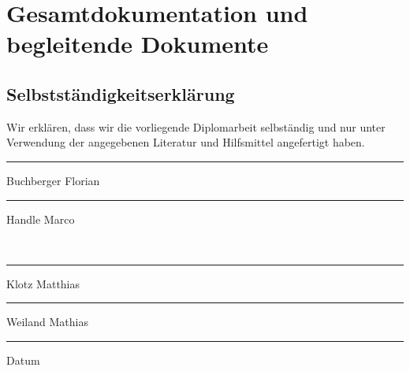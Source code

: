 \chapter[Gesamtdokumentation]{Gesamtdokumentation und begleitende Dokumente}

\section{Selbstständigkeitserklärung}

Wir erklären, dass wir die vorliegende Diplomarbeit selbständig und nur unter Verwendung der angegebenen Literatur und Hilfsmittel angefertigt haben.
\\[4cm]
\parbox{5cm}{\centering\hrule\medskip Buchberger Florian}
\vspace{2cm}
\hfill
\parbox{5cm}{\centering\hrule\medskip Handle Marco}
\vspace{2cm}
\\
\parbox{5cm}{\centering\hrule\medskip Klotz Matthias}
\vspace{2cm}
\hfill
\parbox{5cm}{\centering\hrule\medskip Weiland Mathias}
\vspace{1cm}
\begin{center}
\parbox{5cm}{\centering\hrule\medskip Datum}
\end{center}
